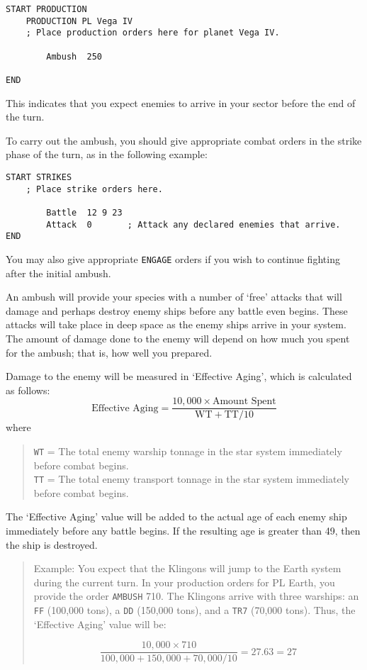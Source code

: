 \documentclass[10pt,titlepage]{article}
\begin{document}
\begin{verbatim}
START PRODUCTION
    PRODUCTION PL Vega IV
    ; Place production orders here for planet Vega IV.

        Ambush  250

END\end{verbatim} 


This indicates that you expect enemies to arrive in your sector before the end
of the turn.

To carry out the ambush, you should give appropriate combat orders in the
strike phase of the turn, as in the following example:

\begin{verbatim}
START STRIKES
    ; Place strike orders here.

        Battle  12 9 23
        Attack  0       ; Attack any declared enemies that arrive.
END\end{verbatim} 


You may also give appropriate \texttt{ENGAGE} orders if you wish to continue fighting
after the initial ambush.

An ambush will provide your species with a number of `free' attacks that will
damage and perhaps destroy enemy ships before any battle even begins.  These
attacks will take place in deep space as the enemy ships arrive in your system.
The amount of damage done to the enemy will depend on how much you spent for
the ambush; that is, how well you prepared.

Damage to the enemy will be measured in `Effective Aging', which is calculated
as follows:
\[
	\textrm{Effective Aging}   =   \dfrac{10,000 \times \textrm{Amount Spent}}{\textrm{WT}  +  \textrm{TT}/10}
\]
where	
\begin{quotation}
     \noindent \texttt{WT} = The total enemy warship tonnage in the star system immediately before combat begins. \\
     \texttt{TT} = The total enemy transport tonnage in the star system immediately before combat begins.
\end{quotation}
The `Effective Aging' value will be added to the actual age of each enemy ship
immediately before any battle begins.  If the resulting age is greater than 49,
then the ship is destroyed.
\begin{quotation}
	Example:  You expect that the Klingons will jump to the Earth system
	during the current turn.  In your production orders for PL Earth, you
	provide the order \texttt{AMBUSH} 710.  The Klingons arrive with three warships:
	an \texttt{FF} (100,000 tons), a \texttt{DD} (150,000 tons), and a \texttt{TR7} (70,000 tons).
	Thus, the `Effective Aging' value will be:

\[
		\dfrac{10,000  \times  710}{100,000  +  150,000  +  70,000/10} =  27.63  = 27
\]

\end{quotation}
\end{document}
